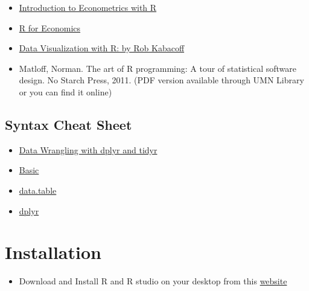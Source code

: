 \documentclass{article}
\begin{document}
\begin{itemize}
    \item \href{https://www.econometrics-with-r.org/index.html}{Introduction to Econometrics with R}
    \item \href{https://libguides.bates.edu/r/r-for-economics}{R for Economics}
    \item \href{https://rkabacoff.github.io/datavis/datavis.pdf}{Data Visualization with R: by Rob Kabacoff}
    \item Matloff, Norman. The art of R programming: A tour of statistical software design. No Starch Press, 2011. (PDF version available through UMN Library or you can find it online)
\end{itemize}
\subsection*{Syntax Cheat Sheet}

\begin{itemize}
    \item \hyperlink{https://www.rstudio.com/wp-content/uploads/2015/02/data-wrangling-cheatsheet.pdf}{Data Wrangling
with dplyr and tidyr}
    \item \href{https://web.mit.edu/hackl/www/lab/turkshop/slides/r-cheatsheet.pdf}{Basic}
    \item \href{https://www.beoptimized.be/pdf/R_Data_Transformation.pdf}{data.table} 
    \item \href{https://nyu-cdsc.github.io/learningr/assets/data-transformation.pdf}{dplyr}
\end{itemize}

\section*{Installation}
\begin{itemize}
    \item Download and Install R and R studio on your desktop from this \href{https://posit.co/download/rstudio-desktop/}{website} 

\end{itemize}

\clearpage
\end{document}
